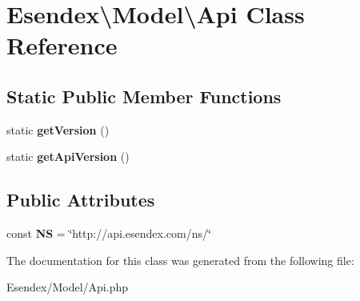 \section{Esendex\textbackslash{}Model\textbackslash{}Api Class Reference}
\label{class_esendex_1_1_model_1_1_api}
\subsection*{Static Public Member Functions}
\begin{DoxyCompactItemize}
\item 
static {\bfseries get\-Version} ()\label{class_esendex_1_1_model_1_1_api_a00c4d6608257409d585a0ceb21769217}

\item 
static {\bfseries get\-Api\-Version} ()\label{class_esendex_1_1_model_1_1_api_a58e151c8ddcc687cc0741ec9df6c4126}

\end{DoxyCompactItemize}
\subsection*{Public Attributes}
\begin{DoxyCompactItemize}
\item 
const {\bfseries N\-S} = \char`\"{}http\-://api.\-esendex.\-com/ns/\char`\"{}\label{class_esendex_1_1_model_1_1_api_afe713f1944988699021be751dd845d7d}

\end{DoxyCompactItemize}


The documentation for this class was generated from the following file\-:\begin{DoxyCompactItemize}
\item 
Esendex/\-Model/Api.\-php\end{DoxyCompactItemize}
